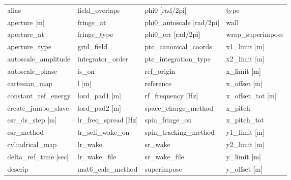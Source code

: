  \begin{tabular}{llll} \toprule
alias                            & field_overlaps                   & phi0 [rad/2pi]                   & type                             \\
aperture [m]                     & fringe_at                        & phi0_autoscale [rad/2pi]         & wall                             \\
aperture_at                      & fringe_type                      & phi0_err [rad/2pi]               & wrap_superimpose                 \\
aperture_type                    & grid_field                       & ptc_canonical_coords             & x1_limit [m]                     \\
autoscale_amplitude              & integrator_order                 & ptc_integration_type             & x2_limit [m]                     \\
autoscale_phase                  & is_on                            & ref_origin                       & x_limit [m]                      \\
cartesian_map                    & l [m]                            & reference                        & x_offset [m]                     \\
constant_ref_energy              & lord_pad1 [m]                    & rf_frequency [Hz]                & x_offset_tot [m]                 \\
create_jumbo_slave               & lord_pad2 [m]                    & space_charge_method              & x_pitch                          \\
csr_ds_step [m]                  & lr_freq_spread [Hz]              & spin_fringe_on                   & x_pitch_tot                      \\
csr_method                       & lr_self_wake_on                  & spin_tracking_method             & y1_limit [m]                     \\
cylindrical_map                  & lr_wake                          & sr_wake                          & y2_limit [m]                     \\
delta_ref_time [sec]             & lr_wake_file                     & sr_wake_file                     & y_limit [m]                      \\
descrip                          & mat6_calc_method                 & superimpose                      & y_offset [m]                     \\

\end{tabular}
